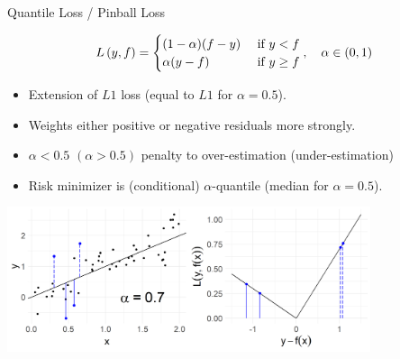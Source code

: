 \documentclass[11pt,compress,t,notes=noshow, xcolor=table]{beamer}
\begin{document}
\begin{vbframe}{Quantile Loss / Pinball Loss}
\vspace{-0.3cm}

\small
$$
L\left(y, f\right) = \begin{cases} (1 - \alpha) (f - y) & \text{ if } y < f\\
\alpha (y - f) & \text{ if } y \ge f
\end{cases}, \quad \alpha \in (0, 1)
$$


\normalsize
\begin{itemize}
\item Extension of $L1$ loss (equal to $L1$ for $\alpha = 0.5$).
\item Weights either positive or negative residuals more strongly. 
\item $\alpha<0.5$ $(\alpha>0.5)$ penalty to over-estimation (under-estimation)
\item Risk minimizer is (conditional) 
    $\alpha$-quantile (median for $\alpha=0.5$).
\end{itemize}

\vfill

\begin{center}
\includegraphics[width = 0.8\textwidth]{figure/loss_quantile.png}
\end{center}




\end{vbframe}




\endlecture
\end{document}
